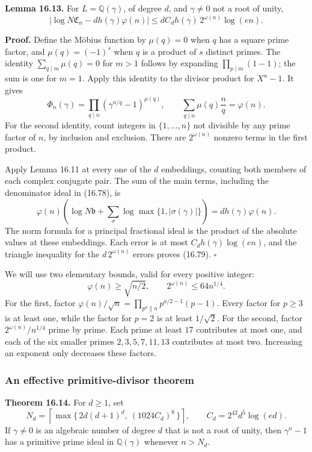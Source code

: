 \documentclass[
  11pt,
  a4paper,
]{article}
\begin{document}
\textbf{Lemma 16.13.} For \(L=\mathbb Q(\gamma)\), of degree \(d\), and
\(\gamma\ne0\) not a root of unity, \[
 \left|\log N\mathfrak C_n-dh(\gamma)\varphi(n)\right|
 \le dC_dh(\gamma)\,2^{\omega(n)}\log(en).
 \tag{16.79}
\]

\textbf{Proof.} Define the Möbius function by \(\mu(q)=0\) when \(q\)
has a square prime factor, and \(\mu(q)=(-1)^s\) when \(q\) is a product
of \(s\) distinct primes. The identity \(\sum_{q\mid m}\mu(q)=0\) for
\(m>1\) follows by expanding \(\prod_{p\mid m}(1-1)\); the sum is one
for \(m=1\). Apply this identity to the divisor product for \(X^n-1\).
It gives \[
 \Phi_n(\gamma)=
 \prod_{q\mid n}(\gamma^{n/q}-1)^{\mu(q)},\qquad
 \sum_{q\mid n}\mu(q)\frac nq=\varphi(n).
 \tag{16.80}
\] For the second identity, count integers in \(\{1,\ldots,n\}\) not
divisible by any prime factor of \(n\), by inclusion and exclusion.
There are \(2^{\omega(n)}\) nonzero terms in the first product.

Apply Lemma 16.11 at every one of the \(d\) embeddings, counting both
members of each complex conjugate pair. The sum of the main terms,
including the denominator ideal in (16.78), is \[
 \varphi(n)\left(\log N\mathfrak b+
       \sum_\sigma\log\max\{1,|\sigma(\gamma)|\}\right)
 =dh(\gamma)\varphi(n).
\] The norm formula for a principal fractional ideal is the product of
the absolute values at these embeddings. Each error is at most
\(C_dh(\gamma)\log(en)\), and the triangle inequality for the
\(d\,2^{\omega(n)}\) errors proves (16.79). \(\square\)

We will use two elementary bounds, valid for every positive integer: \[
 \varphi(n)\ge\sqrt{n/2},\qquad 2^{\omega(n)}\le64n^{1/4}.
 \tag{16.81}
\] For the first, factor
\(\varphi(n)/\sqrt n=\prod_{p^a\parallel n}p^{a/2-1}(p-1)\). Every
factor for \(p\ge3\) is at least one, while the factor for \(p=2\) is at
least \(1/\sqrt2\). For the second, factor \(2^{\omega(n)}/n^{1/4}\)
prime by prime. Each prime at least \(17\) contributes at most one, and
each of the six smaller primes \(2,3,5,7,11,13\) contributes at most
two. Increasing an exponent only decreases these factors.

\subsubsection{An effective primitive-divisor
theorem}\label{an-effective-primitive-divisor-theorem}

\textbf{Theorem 16.14.} For \(d\ge1\), set \[
 N_d=\left\lceil\max\{\,2d(d+1)^d,\ (1024C_d)^8\,\}\right\rceil,
 \qquad C_d=2^{42}d^5\log(ed).
 \tag{16.82}
\] If \(\gamma\ne0\) is an algebraic number of degree \(d\) that is not
a root of unity, then \(\gamma^n-1\) has a primitive prime ideal in
\(\mathbb Q(\gamma)\) whenever \(n>N_d\).
\end{document}
